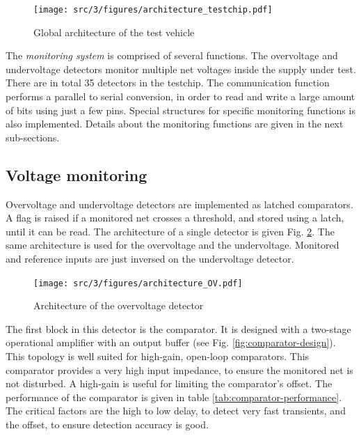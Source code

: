 \begin{figure}[h]
  \centering
  \texttt{[image: src/3/figures/architecture\_testchip.pdf]}
  \caption{Global architecture of the test vehicle}
  \label{architecture_testchip}
\end{figure}

The \textit{monitoring system} is comprised of several functions.
The overvoltage and undervoltage detectors monitor multiple net voltages inside the supply under test.
There are in total 35 detectors in the testchip.
The communication function performs a parallel to serial conversion, in order to read and write a large amount of bits using just a few pins.
Special structures for specific monitoring functions is also implemented.
Details about the monitoring functions are given in the next sub-sections.

\subsection{Voltage monitoring}

Overvoltage and undervoltage detectors are implemented as latched comparators.
A flag is raised if a monitored net crosses a threshold, and stored using a latch, until it can be read.
The architecture of a single detector is given Fig. \ref{fig:architecture-ov}.
The same architecture is used for the overvoltage and the undervoltage.
Monitored and reference inputs are just inversed on the undervoltage detector.

\begin{figure}[!h]
  \centering
  \texttt{[image: src/3/figures/architecture\_OV.pdf]}
  \caption{Architecture of the overvoltage detector}
  \label{fig:architecture-ov}
\end{figure}

The first block in this detector is the comparator.
It is designed with a two-stage operational amplifier with an output buffer (see Fig. \ref{fig:comparator-design}).
This topology is well suited for high-gain, open-loop comparators.
This comparator provides a very high input impedance, to ensure the monitored net is not disturbed.
A high-gain is useful for limiting the comparator's offset.
The performance of the comparator is given in table \ref{tab:comparator-performance}.
The critical factors are the high to low delay, to detect very fast transients, and the offset, to ensure detection accuracy is good.

